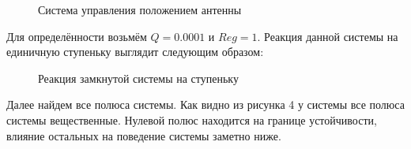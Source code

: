 \documentclass[12pt, a4paper]{report}
\theoremstyle{definition}
\theoremstyle{plain}
\theoremstyle{remark}
\theoremstyle{remark}
\theoremstyle{definition}
\begin{document}
 \begin{figure}[h!]
    \caption{Система управления положением антенны}
\end{figure}

Для определённости возьмём $Q=0.0001$ и $Reg=1$. Реакция данной системы на единичную ступеньку 
выглядит следующим образом: 

 \begin{figure}[h!]
    \caption{Реакция замкнутой системы на ступеньку}
\end{figure}

\newpage
Далее найдем все полюса системы. Как видно из рисунка 4 у системы все полюса системы вещественные. 
Нулевой полюс находится на границе устойчивости, влияние остальных на поведение системы заметно ниже.
\end{document}

